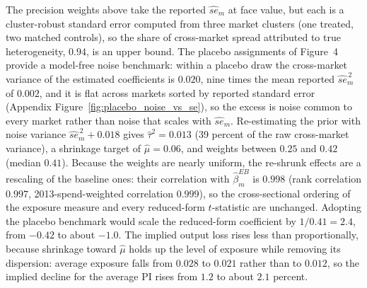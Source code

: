 \documentclass[11pt]{article}
\begin{document}
The precision weights above take the reported $\widehat{se}_m$ at face value,
but each is a cluster-robust standard error computed from three market
clusters (one treated, two matched controls), so the share of cross-market
spread attributed to true heterogeneity, $0.94$, is an upper bound. The
placebo assignments of Figure~4 provide a model-free noise benchmark:
within a placebo draw the cross-market variance of the estimated
coefficients is $0.020$, nine times the mean reported $\widehat{se}_m^{\,2}$
of $0.002$, and it is flat across markets sorted by reported standard error
(Appendix Figure~\ref{fig:placebo_noise_vs_se}), so the excess is noise
common to every market rather than noise that scales with
$\widehat{se}_m$. Re-estimating the prior with noise variance
$\widehat{se}_m^{\,2} + 0.018$ gives $\hat\tau^2 = 0.013$ (39 percent of
the raw cross-market variance), a shrinkage target of $\hat\mu = 0.06$, and
weights between $0.25$ and $0.42$ (median $0.41$). Because the weights are
nearly uniform, the re-shrunk effects are a rescaling of the baseline ones:
their correlation with $\hat\beta^{EB}_m$ is $0.998$ (rank correlation
$0.997$, 2013-spend-weighted correlation $0.999$), so the cross-sectional
ordering of the exposure measure and every reduced-form $t$-statistic are
unchanged. Adopting the placebo benchmark would scale the reduced-form
coefficient by $1/0.41 = 2.4$, from $-0.42$ to about $-1.0$. The implied
output loss rises less than proportionally, because shrinkage toward
$\hat\mu$ holds up the level of exposure while removing its dispersion:
average exposure falls from $0.028$ to $0.021$ rather than to $0.012$, so
the implied decline for the average PI rises from $1.2$ to about $2.1$
percent.
\end{document}
